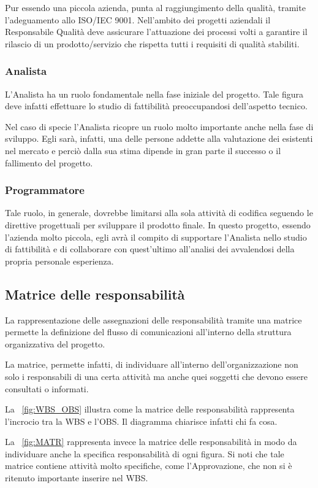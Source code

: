 Pur essendo una piccola azienda, \team punta al raggiungimento della qualità, tramite l'adeguamento allo  ISO/IEC 9001.
Nell'ambito dei progetti aziendali il Responsabile Qualità deve assicurare l'attuazione dei processi volti a garantire il rilascio di un prodotto/servizio che rispetta tutti i requisiti di qualità stabiliti.
	 
\subsubsection{Analista}
L'Analista ha un ruolo fondamentale nella fase iniziale del progetto. Tale figura deve infatti effettuare lo studio di fattibilità preoccupandosi dell'aspetto tecnico.

Nel caso di specie l'Analista ricopre un ruolo molto importante anche nella fase di sviluppo. Egli sarà, infatti, una delle persone addette alla valutazione dei \sw esistenti nel mercato e perciò  dalla sua stima dipende in gran parte il successo o il fallimento del progetto.

\subsubsection{Programmatore}
	Tale ruolo, in generale, dovrebbe limitarsi alla sola attività di codifica seguendo le direttive progettuali per sviluppare il prodotto finale. In questo progetto, essendo l'azienda molto piccola, egli avrà il compito di supportare l'Analista nello studio di fattibilità e di collaborare con quest'ultimo all'analisi dei \sw avvalendosi della propria personale esperienza.

\subsection{Matrice delle responsabilità}
La rappresentazione delle assegnazioni delle responsabilità tramite una matrice permette la definizione del flusso di comunicazioni all'interno della struttura organizzativa del progetto.

La matrice, permette infatti, di individuare all'interno dell'organizzazione non solo i responsabili di una certa attività ma anche quei soggetti che devono essere consultati o informati.

La \figurename~\vref{fig:WBS_OBS} illustra come la matrice delle responsabilità rappresenta l'incrocio tra la WBS e l'OBS\@. Il diagramma chiarisce infatti chi fa cosa.

La \figurename~\vref{fig:MATR} rappresenta invece la matrice delle responsabilità in modo da individuare anche la specifica responsabilità di ogni figura. Si noti che tale matrice contiene attività molto specifiche, come l'Approvazione, che non si è ritenuto importante inserire nel WBS.

